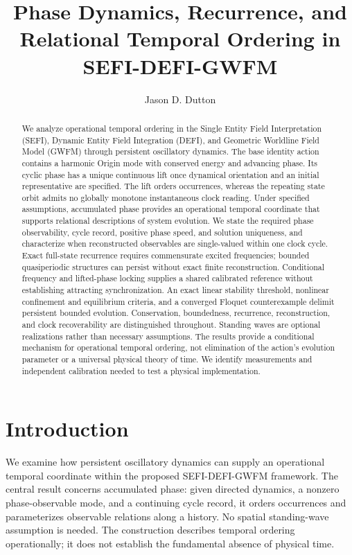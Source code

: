 \documentclass[aip,adv,preprint,floatfix]{revtex4-2}
\begin{document}
\title{Phase Dynamics, Recurrence, and Relational Temporal Ordering in SEFI-DEFI-GWFM}
\author{Jason D. Dutton}
\date{}
\begin{abstract}
We analyze operational temporal ordering in the Single Entity Field Interpretation (SEFI), Dynamic Entity Field Integration (DEFI), and Geometric Worldline Field Model (GWFM) through persistent oscillatory dynamics. The base identity action contains a harmonic Origin mode with conserved energy and advancing phase. Its cyclic phase has a unique continuous lift once dynamical orientation and an initial representative are specified. The lift orders occurrences, whereas the repeating state orbit admits no globally monotone instantaneous clock reading. Under specified assumptions, accumulated phase provides an operational temporal coordinate that supports relational descriptions of system evolution. We state the required phase observability, cycle record, positive phase speed, and solution uniqueness, and characterize when reconstructed observables are single-valued within one clock cycle. Exact full-state recurrence requires commensurate excited frequencies; bounded quasiperiodic structures can persist without exact finite reconstruction. Conditional frequency and lifted-phase locking supplies a shared calibrated reference without establishing attracting synchronization. An exact linear stability threshold, nonlinear confinement and equilibrium criteria, and a converged Floquet counterexample delimit persistent bounded evolution. Conservation, boundedness, recurrence, reconstruction, and clock recoverability are distinguished throughout. Standing waves are optional realizations rather than necessary assumptions. The results provide a conditional mechanism for operational temporal ordering, not elimination of the action's evolution parameter or a universal physical theory of time. We identify measurements and independent calibration needed to test a physical implementation.
\end{abstract}
\maketitle
\section{Introduction}
We examine how persistent oscillatory dynamics can supply an operational temporal coordinate within the proposed SEFI-DEFI-GWFM framework. The central result concerns accumulated phase: given directed dynamics, a nonzero phase-observable mode, and a continuing cycle record, it orders occurrences and parameterizes observable relations along a history. No spatial standing-wave assumption is needed. The construction describes temporal ordering operationally; it does not establish the fundamental absence of physical time.
\end{document}
